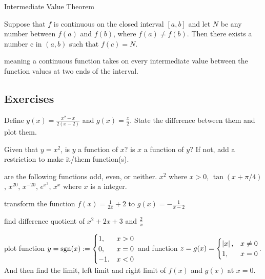\documentclass[Calculus 1 Recitation.tex]{subfiles}
\begin{document}
\begin{myleftlinebox}
	Intermediate Value Theorem
	\tcblower
	\begin{theorem}\label{thm:intermediateValue}
		Suppose that $f$ is continuous on the closed interval $[a, b]$ and let $N$ be any number between $f(a)$ and $f(b)$, where $f(a) \neq f(b)$. Then there exists a number c in $(a, b)$ such that $f(c) = N$.
	\end{theorem}
	meaning a continuous function takes on every intermediate value between the function values at two ends of the interval.
\end{myleftlinebox}


\subsection{Exercises}

\begin{myleftlinebox}
	Define $y(x) = \frac{x^2-x}{2(x-2)}$ and $g(x) = \frac{x}{2}$. State the difference between them and plot them.
	\tcblower
	\vspace{2em}
\end{myleftlinebox}

\begin{myleftlinebox}
	Given that $y=x^2$, is $y$ a function of $x$? is $x$ a function of $y$? If not, add a restriction to make it/them function(s).
	\tcblower
	\vspace{2em}
\end{myleftlinebox}


\begin{myleftlinebox}
	are the following functions odd, even, or neither. \(x^2\) where \(x>0\), \(\tan(x+\pi/4)\), \(x^{20}\), \(x^{-20}\), \(e^{x^3}\), $x^x$ where $x$ is a integer.
	\tcblower
	\vspace{5em}
\end{myleftlinebox}

\begin{myleftlinebox}
	transform the function $f(x)=\frac{1}{2x}+2$ to $g(x)=-\frac{1}{x-2}$
	\tcblower
	\vspace{2em}
\end{myleftlinebox}

\begin{myleftlinebox}
	find difference quotient of \(x^2+2x+3\) and \(\frac{2}{x}\)
	\tcblower
	\vspace{2em}
\end{myleftlinebox}

\begin{myleftlinebox}
	plot function $y=\operatorname{\mathrm{sgn}}(x) := \begin{cases}
		1, & x>0\\
		0, & x=0\\
		-1.& x<0
	\end{cases}$ and function $z = g(x)=\begin{cases}
		\left\vert x\right\vert,& x\neq 0\\
		1, &x=0
	\end{cases}$. And then find the limit, left limit and right limit of $f(x)$ and $g(x)$ at $x=0$.
	\tcblower
	\vspace{3em}
\end{myleftlinebox}
\end{document}
